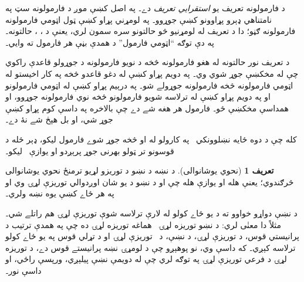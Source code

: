 \documentclass[12pt,a4paper,oneside]{report}
\newcommand{\olfileid}[3]{\gdef\pspart{#1}\gdef\pschapter{#2}\gdef\pssection{#3}}
\gdef\pspart{#2}\gdef\pschapter{#3}\gdef\pssection{}%
\theoremstyle{definition}
\newtheorem{defn}[thm]{تعريف}
\newenvironment{explain}{}{}
\begin{document}
\label{olpseg:OLP-0058-B022:start}
\begin{explain}
د فارمولونه تعريف يو \emph{استقرايي تعريف} دے۔ په اصل کښې موږ
د فارمولونه سټ په نامتناهي ډېرو پړاوونو کښې جوړوو۔ په لومړني
پړاو کښې ټول اټومي فارمولونه فارمولونه ګڼو؛ دا د تعريف له لومړنيو
څو حالتونو سره سمون لري، يعنې د
\LR{$\ltrue$}، %
\LR{$\lfalse$}، %
 حالتونه۔ په دې توګه ``اټومي فارمول'' د همدې بڼې هر
فارمول ته وايي۔
\label{olpseg:OLP-0058-B022:end}

\label{olpseg:OLP-0058-B023:start}
د تعريف نور حالتونه له هغو فارمولونه څخه د نويو فارمولونه د
جوړولو قاعدې راکوي چې له مخکښې جوړ شوي وي۔ په دويم پړاو کښې له دغو
قاعدو څخه په کار اخيستو له اټومي فارمولونه څخه فارمولونه
جوړولے شو۔ په درېيم پړاو کښې له اټومي فارمولونو او په دويم پړاو کښې
له ترلاسه شويو فارمولونو څخه نوي فارمولونه جوړوو، او همداسې مخکښې
ځو۔ فارمول هر هغه شے دے چې بالاخره په داسې کوم پړاو کښې جوړ
شي، او بل هېڅ شے نۀ دے۔
\end{explain}
\label{olpseg:OLP-0058-B023:end}

\label{olpseg:OLP-0058-B024:start}
کله چې د دوه ځايه نښلوونکي~\LR{$\ast$} په کارولو له  او  څخه
جوړ شوے فارمول  ليکو، ډېر ځله د قوسونو تر ټولو بهرنی
جوړ پرېږدو او يوازې~ ليکو۔
\label{olpseg:OLP-0058-B024:end}

\label{olpseg:OLP-0058-B034:start}
\begin{defn}[نحوي يوشانوالی]
د \LR{$\ident$} نښه د نښو د توريزو لړيو ترمنځ نحوي يوشانوالی څرګندوي؛
يعنې  هله او يوازې هله چې  او  د نښو د يو
شان اوږدوالي توريزې لړۍ وي او په هر ځاے کښې يوه نښه ولري۔
\end{defn}
\label{olpseg:OLP-0058-B034:end}

\label{olpseg:OLP-0058-B035:start}
د \LR{$\ident$} نښې دواړو خواوو ته د يو ځاے کولو له لارې ترلاسه شوې
توريزې لړۍ هم راتلے شي۔ مثلاً  دا معنٰی لري:
د نښو توريزه لړۍ~ هماغه توريزه لړۍ ده چې په همدې ترتيب د پرانيستي
قوس، د  توريزې لړۍ، د \LR{$\lor$} نښې، د~ توريزې لړۍ او د تړلي
قوس په يو ځاے کولو ترلاسه کېږي۔ که داسې وي، نو پوهېږو چې د 
لومړۍ نښه پرانيستے قوس دے،  د  توريزه لړۍ د فرعي توريزې
لړۍ په توګه لري چې له دويمې نښې پيلېږي، ورپسې \LR{$\lor$} راځي، او داسې نور۔
\label{olpseg:OLP-0058-B035:end}

\label{olpseg:OLP-0059-B004:start}
\olfileid{pl}{syn}{pre}
\label{olpseg:OLP-0059-B004:end}
\end{document}
